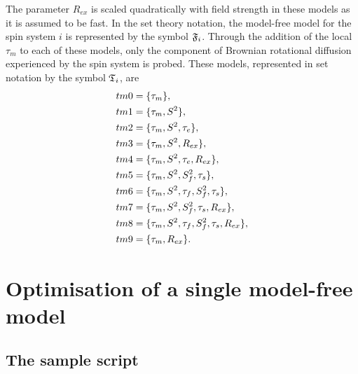 \noindent The parameter $R_{ex}$ is scaled quadratically with field strength in these models as it is assumed to be fast.  In the set theory notation, the model-free model for the spin system $i$ is represented by the symbol $\mathfrak{F}_i$.  Through the addition of the local $\tau_m$ to each of these models, only the component of Brownian rotational diffusion experienced by the spin system is probed.  These models, represented in set notation by the symbol $\mathfrak{T}_i$, are
\begin{subequations}
\renewcommand{\theequation}{\theparentequation .\arabic{equation}}
\addtocounter{equation}{-1}
\begin{align}
 tm0 &= \{\tau_m\},                                     \label{model: tm0} \\
 tm1 &= \{\tau_m, S^2\},                                \label{model: tm1} \\
 tm2 &= \{\tau_m, S^2, \tau_e\},                        \label{model: tm2} \\
 tm3 &= \{\tau_m, S^2, R_{ex}\},                        \label{model: tm3} \\
 tm4 &= \{\tau_m, S^2, \tau_e, R_{ex}\},                \label{model: tm4} \\
 tm5 &= \{\tau_m, S^2, S^2_f, \tau_s\},                 \label{model: tm5} \\
 tm6 &= \{\tau_m, S^2, \tau_f, S^2_f, \tau_s\},         \label{model: tm6} \\
 tm7 &= \{\tau_m, S^2, S^2_f, \tau_s, R_{ex}\},         \label{model: tm7} \\
 tm8 &= \{\tau_m, S^2, \tau_f, S^2_f, \tau_s, R_{ex}\}, \label{model: tm8} \\
 tm9 &= \{\tau_m, R_{ex}\}.                             \label{model: tm9}
\end{align}
\end{subequations}





\section{Optimisation of a single model-free model}



\subsection{The sample script}


